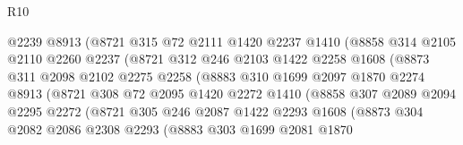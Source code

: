 \begin{lexlean}{R10}
\begin{coremodule}
                        @2239
                        @8913
                        (@8721
                          @315
                          @72
                          @2111
                          @1420
                          @2237
                          @1410
                          (@8858
                            @314
                            @2105
                            @2110
                            @2260
                            @2237
                            (@8721
                              @312
                              @246
                              @2103
                              @1422
                              @2258
                              @1608
                              (@8873
                                @311
                                @2098
                                @2102
                                @2275
                                @2258
                                (@8883
                                  @310
                                  @1699
                                  @2097
                                  @1870
                                  @2274
                                  @8913
                                  (@8721
                                    @308
                                    @72
                                    @2095
                                    @1420
                                    @2272
                                    @1410
                                    (@8858
                                      @307
                                      @2089
                                      @2094
                                      @2295
                                      @2272
                                      (@8721
                                        @305
                                        @246
                                        @2087
                                        @1422
                                        @2293
                                        @1608
                                        (@8873
                                          @304
                                          @2082
                                          @2086
                                          @2308
                                          @2293
                                          (@8883
                                            @303
                                            @1699
                                            @2081
                                            @1870

\end{coremodule}
\end{lexlean}
